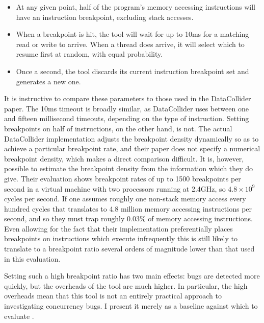 \begin{itemize}
\item
  At any given point, half of the program's memory accessing
  instructions will have an instruction breakpoint, excluding stack
  accesses.
\item
  When a breakpoint is hit, the tool will wait for up to 10ms for a
  matching read or write to arrive.  When a thread does arrive, it
  will select which to resume first at random, with equal probability.
\item
  Once a second, the tool discards its current instruction breakpoint
  set and generates a new one.
\end{itemize}

It is instructive to compare these parameters to those used in the
DataCollider paper.  The 10ms timeout is broadly similar, as
DataCollider uses between one and fifteen millisecond timeouts,
depending on the type of instruction.  Setting breakpoints on half of
instructions, on the other hand, is not.  The actual DataCollider
implementation adjusts the breakpoint density dynamically so as to
achieve a particular breakpoint rate, and their paper does not specify
a numerical breakpoint density, which makes a direct comparison
difficult.  It is, however, possible to estimate the breakpoint
density from the information which they do give.  Their evaluation
shows breakpoint rates of up to 1500 breakpoints per second in a
virtual machine with two processors running at 2.4GHz, so $4.8 \times
10^9$ cycles per second.  If one assumes roughly one non-stack memory
access every hundred cycles that translates to 4.8 million memory
accessing instructions per second, and so they must trap roughly
0.03\% of memory accessing instructions.  Even allowing for the fact
that their implementation preferentially places breakpoints on
instructions which execute infrequently this is still likely to
translate to a breakpoint ratio several orders of magnitude lower than
that used in this evaluation.

Setting such a high breakpoint ratio has two main effects: bugs are
detected more quickly, but the overheads of the tool are much higher.
In particular, the high overheads mean that this tool is not an
entirely practical approach to investigating concurrency bugs.  I
present it merely as a baseline against which to evaluate
{\implementation}.  

